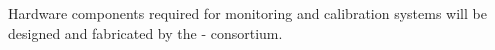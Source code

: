 Hardware components required for  monitoring and calibration systems will be designed and fabricated by the - consortium. %



